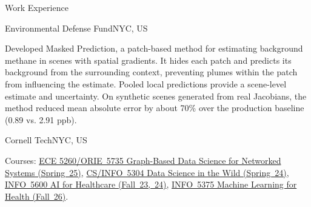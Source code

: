 \documentclass{resume} %
\begin{document}



\begin{rSection}{Work Experience}

\begin{rExperienceSubsection}{Environmental Defense Fund}{NYC, US}
\begin{experienceDetails}
\item Developed Masked Prediction, a patch-based method for estimating background methane in scenes with spatial gradients. It hides each patch and predicts its background from the surrounding context, preventing plumes within the patch from influencing the estimate. Pooled local predictions provide a scene-level estimate and uncertainty. On synthetic scenes generated from real Jacobians, the method reduced mean absolute error by about 70\% over the production baseline (0.89 vs. 2.91 ppb). 
\end{experienceDetails}
\end{rExperienceSubsection}

\begin{rExperienceSubsection}{Cornell Tech}{NYC, US}
\begin{experienceDetails}
\item Courses: \href{https://classes.cornell.edu/browse/roster/SP25/class/ECE/5260}{ECE 5260/ORIE~5735 Graph-Based Data Science for Networked Systems (Spring~25)},
\href{https://classes.cornell.edu/browse/roster/SP24/class/CS/5304}{CS/INFO~5304 Data Science in the Wild (Spring~24)}, \href{https://classes.cornell.edu/browse/roster/FA23/class/INFO/5600}{INFO~5600 AI for Healthcare (Fall~23,~24)}, \href{https://classes.cornell.edu/browse/roster/FA23/class/INFO/5600}{INFO~5375 Machine Learning for Health (Fall~26)}.
\end{experienceDetails}
\end{rExperienceSubsection}



\end{rSection}
\end{document}
